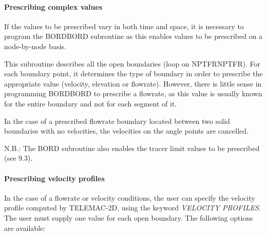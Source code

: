 \documentclass{article} %
\begin{document}
\paragraph{ Prescribing complex values}

 If the values to be prescribed vary in both time and space, it is necessary to program the BORDBORD subroutine as this enables values to be prescribed on a node-by-node basis.

 This subroutine describes all the open boundaries (loop on NPTFRNPTFR). For each boundary point, it determines the type of boundary in order to prescribe the appropriate value (velocity, elevation or flowrate). However, there is little sense in programming BORDBORD to prescribe a flowrate, as this value is usually known for the entire boundary and not for each segment of it.

 In the case of a prescribed flowrate boundary located between two solid boundaries with no velocities, the velocities on the angle points are cancelled.

 N.B.: The BORD subroutine also enables the tracer limit values to be prescribed (see 9.3).


\paragraph{ Prescribing velocity profiles}

 In the case of a flowrate or velocity conditions, the user can specify the velocity profile computed by TELEMAC-2D, using the keyword \textit{VELOCITY PROFILES}. The user must supply one value for each open boundary. The following options are available:
\end{document}
